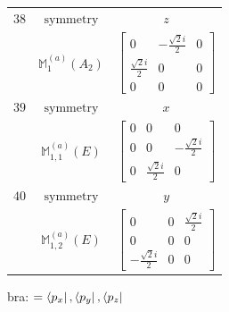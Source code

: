 \documentclass[fleqn,8pt,landscape]{jsarticle}
\begin{document}
\begin{longtable}{ccc}
$ 38 $ & $ \text{symmetry} $ & $ z $ \\
$  $ & $ \mathbb{M}_{1}^{(a)}(A_{2}) $ & $ \begin{bmatrix} 0 & - \frac{\sqrt{2} i}{2} & 0 \\ \frac{\sqrt{2} i}{2} & 0 & 0 \\ 0 & 0 & 0 \end{bmatrix} $ \\ \hline
$ 39 $ & $ \text{symmetry} $ & $ x $ \\
$  $ & $ \mathbb{M}_{1,1}^{(a)}(E) $ & $ \begin{bmatrix} 0 & 0 & 0 \\ 0 & 0 & - \frac{\sqrt{2} i}{2} \\ 0 & \frac{\sqrt{2} i}{2} & 0 \end{bmatrix} $ \\ \hline
$ 40 $ & $ \text{symmetry} $ & $ y $ \\
$  $ & $ \mathbb{M}_{1,2}^{(a)}(E) $ & $ \begin{bmatrix} 0 & 0 & \frac{\sqrt{2} i}{2} \\ 0 & 0 & 0 \\ - \frac{\sqrt{2} i}{2} & 0 & 0 \end{bmatrix} $ \\ \hline
\end{longtable}
bra: $=\bra{p_{x}}, \bra{p_{y}}, \bra{p_{z}}$
\end{document}
